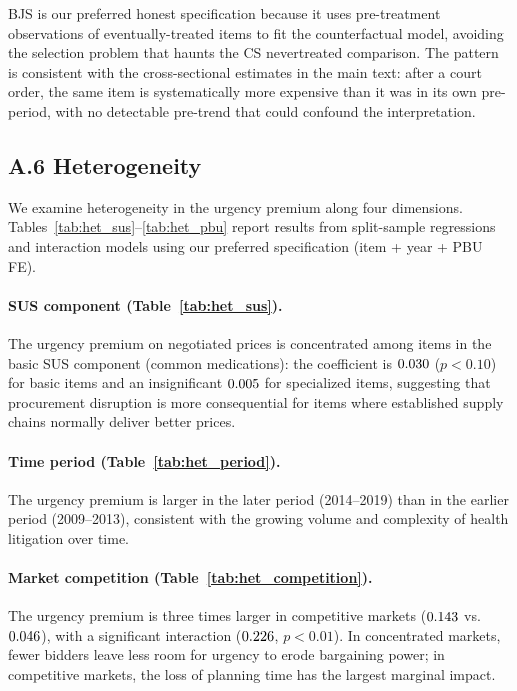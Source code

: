 BJS is our preferred honest specification because it uses pre-treatment
observations of eventually-treated items to fit the counterfactual model,
avoiding the selection problem that haunts the CS nevertreated comparison.
The pattern is consistent with the cross-sectional estimates in the main
text: after a court order, the same item is systematically more expensive
than it was in its own pre-period, with no detectable pre-trend that could
confound the interpretation.

\subsection*{A.6 Heterogeneity}
\label{sec:appendix_het}

We examine heterogeneity in the urgency premium along four dimensions. Tables~\ref{tab:het_sus}--\ref{tab:het_pbu} report results from split-sample regressions and interaction models using our preferred specification (item + year + PBU FE).


\paragraph{SUS component (Table~\ref{tab:het_sus}).}
The urgency premium on negotiated prices is concentrated among items in the basic SUS component (common medications): the coefficient is $0.030$ ($p < 0.10$) for basic items and an insignificant $0.005$ for specialized items, suggesting that procurement disruption is more consequential for items where established supply chains normally deliver better prices.

\paragraph{Time period (Table~\ref{tab:het_period}).}
The urgency premium is larger in the later period (2014--2019) than in the earlier period (2009--2013), consistent with the growing volume and complexity of health litigation over time.

\paragraph{Market competition (Table~\ref{tab:het_competition}).}
The urgency premium is three times larger in competitive markets ($0.143$ vs.\ $0.046$), with a significant interaction ($0.226$, $p < 0.01$). In concentrated markets, fewer bidders leave less room for urgency to erode bargaining power; in competitive markets, the loss of planning time has the largest marginal impact.

